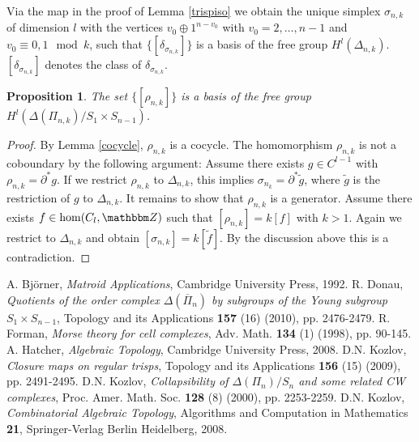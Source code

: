\documentclass{elsarticle}
\newtheorem{prop}[df]{Proposition}
\def\Z{\mathbbm Z}
\begin{document}
Via the map in the proof of Lemma \ref{trispiso} we obtain the unique simplex $\sigma_{n,k}$ of dimension $l$ with the vertices $v_0\oplus 1^{n-v_0}$ with $v_0=2,\dots,n-1$ and $v_0\equiv 0,1\mod k$, such that $\{[\delta_{\sigma_{n,k}}]\}$ is a basis of the free group $H^l(\Delta_{n,k})$. $[\delta_{\sigma_{n,k}}]$ denotes the class of $\delta_{\sigma_{n,k}}$.
\begin{prop}
The set $\{[\rho_{n,k}]\}$ is a basis of the free group $H^l(\Delta(\Pi_{n,k})/S_1\times S_{n-1})$.
\end{prop}
\begin{proof}
By Lemma \ref{cocycle}, $\rho_{n,k}$ is a cocycle. The homomorphism $\rho_{n,k}$ is not a coboundary by the following argument: Assume there exists $g\in C^{l-1}$ with $\rho_{n,k}=\partial^*g$. If we restrict $\rho_{n,k}$ to $\Delta_{n,k}$, this implies $\sigma_{n_k}=\partial^*\widetilde g$, where $\widetilde g$ is the restriction of $g$ to $\Delta_{n,k}$. It remains to show that $\rho_{n,k}$ is a generator. Assume there exists $f\in\hom(C_l,\Z)$ such that $[\rho_{n,k}]=k[f]$ with $k>1$. Again we restrict to $\Delta_{n,k}$ and obtain $[\sigma_{n,k}]=k[\widetilde f]$. By the discussion above this is a contradiction.
\end{proof}

\begin{thebibliography}{00}
A. Bj\"orner, \textit{Matroid Applications}, Cambridge University Press, 1992.
R. Donau, \textit{Quotients of the order complex $\Delta(\overline{\Pi}_n)$ by subgroups of the Young subgroup $S_1\times S_{n-1}$}, Topology and its Applications \textbf{157} (16) (2010), pp. 2476-2479.
R. Forman, \textit{Morse theory for cell complexes}, Adv. Math. \textbf{134} (1) (1998), pp. 90-145.
A. Hatcher, \textit{Algebraic Topology}, Cambridge University Press, 2008.
D.N. Kozlov, \textit{Closure maps on regular trisps}, Topology and its Applications \textbf{156} (15) (2009), pp. 2491-2495.
D.N. Kozlov, \textit{Collapsibility of $\Delta(\Pi_n)/S_n$ and some related CW complexes}, Proc. Amer. Math. Soc. \textbf{128} (8) (2000), pp. 2253-2259.
D.N. Kozlov, \textit{Combinatorial Algebraic Topology}, Algorithms and Computation in Mathematics \textbf{21}, Springer-Verlag Berlin Heidelberg, 2008.
\end{thebibliography}
\end{document}

